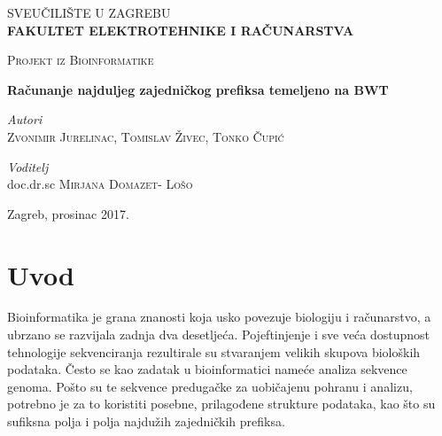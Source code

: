 \documentclass[a4paper,12pt]{article}
\begin{document}
\begin{titlepage}
	\center

	\textsc{\Large SVEUČILIŠTE U ZAGREBU}\\
	\vspace{0.4cm}
	\textsc{\Large \textbf{FAKULTET ELEKTROTEHNIKE I RAČUNARSTVA}}
	\vspace{2.5cm}
	\vfill\vfill

	\textsc{\Large Projekt iz Bioinformatike}
	\vspace{0.5cm}

	{\huge\bfseries Računanje najduljeg zajedničkog prefiksa temeljeno na BWT}
	\vspace{1.2cm}

	\begin{minipage}{2.5\textwidth}
		\begin{flushleft}
			\large
			\textit{Autori}\\
			\textsc{Zvonimir Jurelinac, Tomislav Živec, Tonko Čupić}
		\end{flushleft}
	\end{minipage}

	\vspace{0.3cm}

	\begin{minipage}{2.5\textwidth}
		\begin{flushleft}
			\large
			\textit{Voditelj}\\
			doc.dr.sc \textsc{Mirjana Domazet- Lošo}
		\end{flushleft}
	\end{minipage}

	\vfill\vfill\vfill\vfill
	{\large Zagreb, prosinac 2017.}

\end{titlepage}

\newpage

\tableofcontents
\newpage

\section{Uvod}

Bioinformatika je grana znanosti koja usko povezuje biologiju i računarstvo, a ubrzano se razvijala zadnja dva desetljeća. Pojeftinjenje i sve veća dostupnost tehnologije sekvenciranja rezultirale su stvaranjem velikih skupova bioloških podataka. Često se kao zadatak u bioinformatici nameće analiza sekvence genoma. Pošto su te sekvence predugačke za uobičajenu pohranu i analizu, potrebno je za to koristiti posebne, prilagođene strukture podataka, kao što su sufiksna polja i polja najdužih zajedničkih prefiksa.
\end{document}
